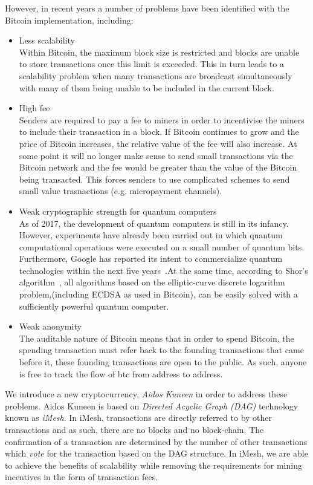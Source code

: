 \documentclass[a4paper,10pt,twocolumn]{article}
\begin{document}
However, in recent years a number of problems have been identified with the Bitcoin implementation, including:
\vspace{-0.5\baselineskip}
\begin{itemize}
	\setlength\itemsep{0em}
	\item{Less scalability}\mbox{}\\ 
	Within Bitcoin, the maximum block size is restricted and blocks are unable to store transactions once this limit is exceeded. 
	This in turn leads to a scalability problem when many transactions are broadcast simultaneously with many of them being unable 
	to be included in the current block.
	\item{High fee}\mbox{}\\ 
	Senders are required to pay a fee to miners in order to incentivise the miners to include their transaction in a block.
	If Bitcoin continues to grow and the price of Bitcoin increases, the relative value of the fee will also increase. At some point
	it will no longer make sense to send small transactions via the Bitcoin network and the fee would be greater than the value of 
	the Bitcoin being transacted. This forces senders to use complicated schemes to send small value trasnactions (e.g. micropayment 
	channels).
	\item{Weak cryptographic strength for quantum computers}\mbox{}\\ 
	As of 2017, the development of quantum computers is still in its infancy. However, experiments have already been carried out in 
	which quantum computational operations were executed on a small number of quantum bits. Furthermore, Google has reported its 
	intent to commercialize quantum technologies within the next five years~\cite{google}.At the same time, according to Shor's 
	algorithm~\cite{shor}, all algorithms based on the elliptic-curve discrete logarithm problem,(including ECDSA as used in 
	Bitcoin), can be easily solved with a sufficiently powerful quantum computer. 
	\item{Weak anonymity}\mbox{}\\ 
	The auditable nature of Bitcoin means that in order to spend Bitcoin, the spending transaction must refer back to the founding
	transactions that came before it, these founding transactions are open to the public. As such, anyone is free to track the flow
	of btc from address to address.
\end{itemize}

We introduce a new cryptocurrency, \emph{Aidos Kuneen} in order to address these problems.
Aidos Kuneen is based on \emph{Directed Acyclic Graph (DAG)} technology known as \emph{iMesh}.
In iMesh, transactions are directly referred to by other transactions and as such, there are no blocks and no block-chain.
The confirmation of a transaction are determined by the number of other transactions which \emph{vote}
for the transaction based on the DAG structure. In iMesh, we are able to achieve the benefits of scalability while removing the 
requirements for mining incentives in the form of transaction fees.
\end{document}
